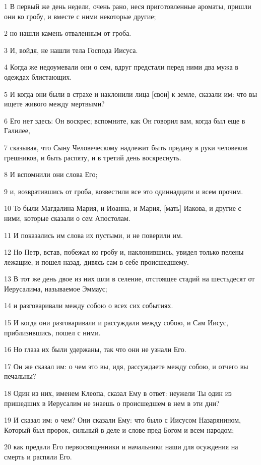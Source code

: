 \par 1 В первый же день недели, очень рано, неся приготовленные ароматы, пришли они ко гробу, и вместе с ними некоторые другие;
\par 2 но нашли камень отваленным от гроба.
\par 3 И, войдя, не нашли тела Господа Иисуса.
\par 4 Когда же недоумевали они о сем, вдруг предстали перед ними два мужа в одеждах блистающих.
\par 5 И когда они были в страхе и наклонили лица [свои] к земле, сказали им: что вы ищете живого между мертвыми?
\par 6 Его нет здесь: Он воскрес; вспомните, как Он говорил вам, когда был еще в Галилее,
\par 7 сказывая, что Сыну Человеческому надлежит быть предану в руки человеков грешников, и быть распяту, и в третий день воскреснуть.
\par 8 И вспомнили они слова Его;
\par 9 и, возвратившись от гроба, возвестили все это одиннадцати и всем прочим.
\par 10 То были Магдалина Мария, и Иоанна, и Мария, [мать] Иакова, и другие с ними, которые сказали о сем Апостолам.
\par 11 И показались им слова их пустыми, и не поверили им.
\par 12 Но Петр, встав, побежал ко гробу и, наклонившись, увидел только пелены лежащие, и пошел назад, дивясь сам в себе происшедшему.
\par 13 В тот же день двое из них шли в селение, отстоящее стадий на шестьдесят от Иерусалима, называемое Эммаус;
\par 14 и разговаривали между собою о всех сих событиях.
\par 15 И когда они разговаривали и рассуждали между собою, и Сам Иисус, приблизившись, пошел с ними.
\par 16 Но глаза их были удержаны, так что они не узнали Его.
\par 17 Он же сказал им: о чем это вы, идя, рассуждаете между собою, и отчего вы печальны?
\par 18 Один из них, именем Клеопа, сказал Ему в ответ: неужели Ты один из пришедших в Иерусалим не знаешь о происшедшем в нем в эти дни?
\par 19 И сказал им: о чем? Они сказали Ему: что было с Иисусом Назарянином, Который был пророк, сильный в деле и слове пред Богом и всем народом;
\par 20 как предали Его первосвященники и начальники наши для осуждения на смерть и распяли Его.
